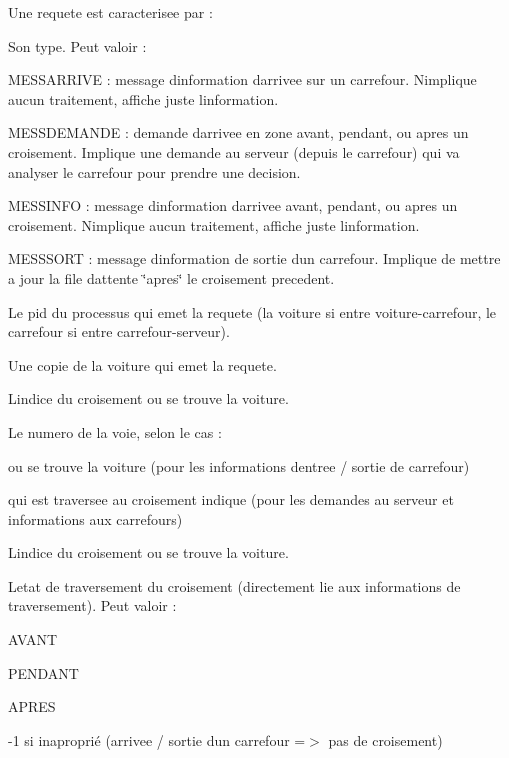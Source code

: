 Une requete est caracterisee par \+:
\begin{DoxyItemize}
\item Son type. Peut valoir \+:
\begin{DoxyItemize}
\item M\+E\+S\+S\+A\+R\+R\+I\+V\+E \+: message d\textquotesingle{}information d\textquotesingle{}arrivee sur un carrefour. N\textquotesingle{}implique aucun traitement, affiche juste l\textquotesingle{}information.
\item M\+E\+S\+S\+D\+E\+M\+A\+N\+D\+E \+: demande d\textquotesingle{}arrivee en zone avant, pendant, ou apres un croisement. Implique une demande au serveur (depuis le carrefour) qui va analyser le carrefour pour prendre une decision.
\item M\+E\+S\+S\+I\+N\+F\+O \+: message d\textquotesingle{}information d\textquotesingle{}arrivee avant, pendant, ou apres un croisement. N\textquotesingle{}implique aucun traitement, affiche juste l\textquotesingle{}information.
\item M\+E\+S\+S\+S\+O\+R\+T \+: message d\textquotesingle{}information de sortie d\textquotesingle{}un carrefour. Implique de mettre a jour la file d\textquotesingle{}attente \char`\"{}apres\char`\"{} le croisement precedent.
\end{DoxyItemize}
\item Le pid du processus qui emet la requete (la voiture si entre voiture-\/carrefour, le carrefour si entre carrefour-\/serveur).
\item Une copie de la voiture qui emet la requete.
\item L\textquotesingle{}indice du croisement ou se trouve la voiture.
\item Le numero de la voie, selon le cas \+:
\begin{DoxyItemize}
\item ou se trouve la voiture (pour les informations d\textquotesingle{}entree / sortie de carrefour)
\item qui est traversee au croisement indique (pour les demandes au serveur et informations aux carrefours)
\end{DoxyItemize}
\item L\textquotesingle{}indice du croisement ou se trouve la voiture.
\item L\textquotesingle{}etat de traversement du croisement (directement lie aux informations de traversement). Peut valoir \+:
\begin{DoxyItemize}
\item A\+V\+A\+N\+T
\item P\+E\+N\+D\+A\+N\+T
\item A\+P\+R\+E\+S
\item -\/1 si inaproprié (arrivee / sortie d\textquotesingle{}un carrefour =$>$ pas de croisement) 
\end{DoxyItemize}
\end{DoxyItemize}

